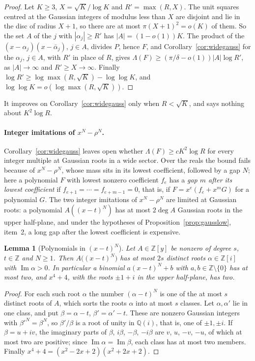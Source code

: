 \documentclass[11pt]{article}
\newtheorem{lemma}[theorem]{Lemma}
\begin{document}
\begin{proof}
Let $K\ge3$, $X=\sqrt K/\log K$ and $R'=\max(R,X)$.  The unit squares
centred at the Gaussian integers of modulus less than $X$ are disjoint and
lie in the disc of radius $X+1$, so there are at most $\pi(X+1)^2=o(K)$ of
them.  So the set $A$ of the $j$ with $|\alpha_j|\ge R'$ has
$|A|=(1-o(1))K$.  The product of the $(x-\alpha_j)(x-\bar\alpha_j)$,
$j\in A$, divides $P$, hence $F$, and Corollary~\ref{cor:widegauss} for the
$\alpha_j$, $j\in A$, with $R'$ in place of $R$, gives
$\Lambda(F)\ge(\pi/\delta-o(1))|A|\log R'$, as $|A|\to\infty$ and
$R'\ge X\to\infty$.  Finally
$\log R'\ge\log\max(R,\sqrt K)-\log\log K$, and
$\log\log K=o(\log\max(R,\sqrt K))$.
\end{proof}

It improves on Corollary~\ref{cor:widegauss} only when $R<\sqrt K$, and
says nothing about $K^2\log R$.

\paragraph{Integer imitations of $x^N-\rho^N$.}  Corollary~\ref{cor:widegauss}
leaves open whether $\Lambda(F)\ge cK^2\log R$ for every integer multiple at
Gaussian roots in a wide sector.  Over the reals the bound fails because of
$x^N-\rho^N$, whose mass sits in its lowest coefficient, followed by a gap
$N$; here a polynomial $F$ with lowest nonzero coefficient $f_e$ has a
\emph{gap $m$ after its lowest coefficient} if $f_{e+1}=\cdots=f_{e+m-1}=0$,
that is, if $F=x^e(f_e+x^mG)$ for a polynomial $G$.  The two integer
imitations of $x^N-\rho^N$ are limited at Gaussian roots: a
polynomial $A((x-t)^N)$ has at most $2\deg A$ Gaussian roots in the upper
half-plane, and under the hypotheses of Proposition~\ref{prop:gausslow},
item~2, a long gap after the lowest coefficient is expensive.

\begin{lemma}[Polynomials in $(x-t)^N$]\label{lem:gaussbinom}
Let $A\in\mathbb Z[y]$ be nonzero of degree $s$, $t\in\mathbb Z$ and $N\ge1$.
Then $A\bigl((x-t)^N\bigr)$ has at most $2s$ distinct roots $\alpha\in\mathbb Z[i]$
with $\operatorname{Im}\alpha>0$.  In particular a binomial $a(x-t)^N+b$ with
$a,b\in\mathbb Z\setminus\{0\}$ has at most two, and $x^4+4$, with the roots
$\pm1+i$ in the upper half-plane, has two.
\end{lemma}

\begin{proof}
For each such root $\alpha$ the number $(\alpha-t)^N$ is one of the at most $s$
distinct roots of $A$, which sorts the roots $\alpha$ into at most $s$ classes.
Let $\alpha,\alpha'$ lie in one class, and put $\beta=\alpha-t$,
$\beta'=\alpha'-t$.  These are nonzero Gaussian integers with
$\beta'^N=\beta^N$, so $\beta'/\beta$ is a root of unity in $\mathbb Q(i)$,
that is, one of $\pm1,\pm i$.  If $\beta=u+iv$, the imaginary parts of $\beta$,
$i\beta$, $-\beta$, $-i\beta$ are $v$, $u$, $-v$, $-u$, of which at most two are
positive; since $\operatorname{Im}\alpha=\operatorname{Im}\beta$, each class has
at most two members.  Finally $x^4+4=(x^2-2x+2)(x^2+2x+2)$.
\end{proof}
\end{document}
